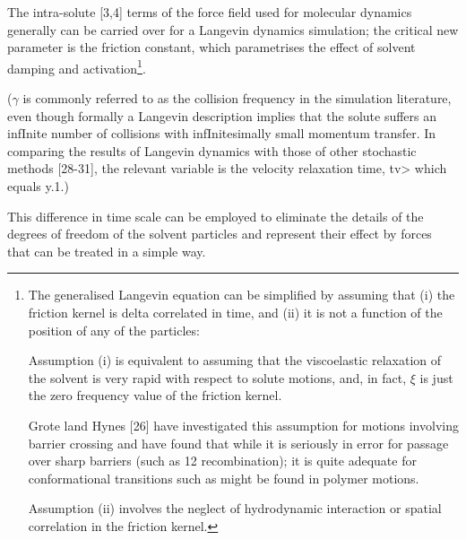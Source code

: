 \documentclass[../../main-notes.tex]{subfiles}
\begin{document}
The intra-solute [3,4] terms of the force field used for molecular dynamics generally can be carried over for a Langevin dynamics simulation; the critical new parameter is the friction constant, which parametrises the effect of solvent damping and activation\footnote{The generalised Langevin equation can be simplified by assuming that (i) the friction kernel is delta correlated in time, and (ii) it is not a function of the position of any of the particles:

Assumption (i) is equivalent to assuming that the viscoelastic relaxation of the solvent is very rapid with respect to solute motions, and, in fact, $\xi$ is just the zero frequency value of the friction kernel.

Grote land Hynes [26] have investigated this assumption for motions involving barrier crossing and have found that while it is seriously in error for passage over sharp barriers (such as 12 recombination); it is quite adequate for conformational transitions such as might be found in polymer motions.

Assumption (ii) involves the neglect of hydrodynamic interaction or spatial correlation in the friction kernel\citep{pastorTechniquesApplicationsLangevin1994}.

}\citep{pastorTechniquesApplicationsLangevin1994}.

($\gamma$ is commonly referred to as the collision frequency in the simulation literature, even though formally a Langevin description implies that the solute suffers an infInite number of collisions with infInitesimally small momentum transfer. In comparing the results of Langevin dynamics with those of other stochastic methods [28-31], the relevant variable is the velocity relaxation time, tv> which equals y.1.\citep{pastorTechniquesApplicationsLangevin1994})



This difference in time scale can be employed to eliminate the details of the degrees of freedom of the solvent particles and represent their effect by forces that can be treated in a simple way.
\end{document}
